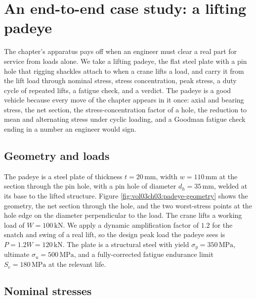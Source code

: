 \section{An end-to-end case study: a lifting padeye}

The chapter's apparatus pays off when an engineer must clear a real
part for service from loads alone. We take a lifting padeye, the flat
steel plate with a pin hole that rigging shackles attach to when a
crane lifts a load, and carry it from the lift load through nominal
stress, stress concentration, peak stress, a duty cycle of repeated
lifts, a fatigue check, and a verdict. The padeye is a good vehicle
because every move of the chapter appears in it once: axial and bearing
stress, the net section, the stress-concentration factor of a hole, the
reduction to mean and alternating stress under cyclic loading, and a
Goodman fatigue check ending in a number an engineer would sign.

\subsection{Geometry and loads}

The padeye is a steel plate of thickness $t = 20\,\si{\milli\meter}$,
width $w = 110\,\si{\milli\meter}$ at the section through the pin hole,
with a pin hole of diameter $d_h = 35\,\si{\milli\meter}$, welded at its
base to the lifted structure. Figure
\ref{fig:vol03ch03:padeye-geometry} shows the geometry, the net section
through the hole, and the two worst-stress points at the hole edge on
the diameter perpendicular to the load. The crane lifts a working load
of $W = 100\,\text{kN}$. We apply a dynamic amplification factor of
$1.2$ for the snatch and swing of a real lift, so the design peak load
the padeye sees is $P = 1.2 W = 120\,\text{kN}$. The plate is a
structural steel with yield $\sigma_y = 350\,\text{MPa}$, ultimate
$\sigma_u = 500\,\text{MPa}$, and a fully-corrected fatigue endurance
limit $S_e = 180\,\text{MPa}$ at the relevant life.



\subsection{Nominal stresses}

